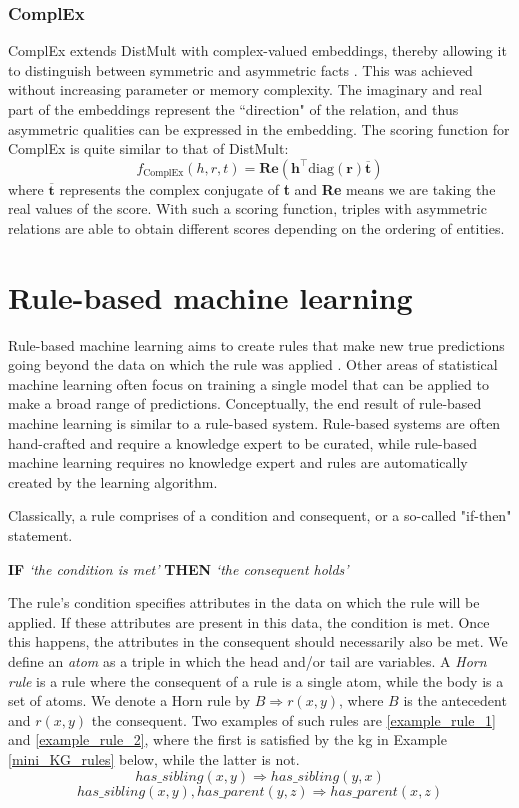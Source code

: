 \subsubsection{ComplEx}
ComplEx extends DistMult with complex-valued embeddings, thereby allowing it to distinguish between symmetric and asymmetric facts \cite{complEx}. This was achieved without increasing parameter or memory complexity. The imaginary and real part of the embeddings represent the ``direction" of the relation, and thus asymmetric qualities can be expressed in the embedding. The scoring function for ComplEx is quite similar to that of DistMult:
\[f_ {\text{ComplEx}}(h, r, t) =\textbf{Re}(\textbf{h}^{\top}\text{diag}(\textbf{r})\overline{\textbf{t}})\]
where $\overline{\textbf{t}}$ represents the complex conjugate of \textbf{t} and \textbf{Re} means we are taking the real values of the score. With such a scoring function, triples with asymmetric relations are able to obtain different scores depending on the ordering of entities.
    

\section{Rule-based machine learning}
Rule-based machine learning aims to create rules that make new true predictions going beyond the data on which the rule was applied \cite{weiss1995rule}. Other areas of statistical machine learning often focus on training a single model that can be applied to make a broad range of predictions. Conceptually, the end result of rule-based machine learning is similar to a rule-based system.  Rule-based systems are often hand-crafted and require a knowledge expert to be curated, while rule-based machine learning requires no knowledge expert and rules are automatically created by the learning algorithm.

Classically, a rule comprises of a condition and consequent, or a so-called "if-then" statement. \begin{center} \textbf{IF} \textit{`the condition is met'} \textbf{THEN} \textit{`the consequent holds'} \end{center}
The rule's condition specifies attributes in the data on which the rule will be applied. If these attributes are present in this data, the condition is met. Once this happens, the attributes in the consequent should necessarily also be met. We define an \textit{atom} as a triple in which the head and/or tail are variables. A \textit{Horn rule} is a rule where the consequent of a rule is a single atom, while the body is a set of atoms. We denote a Horn rule by $B \Rightarrow r(x, y)$, where $B$ is the antecedent and $r(x, y)$ the consequent. Two examples of such rules are \ref{example_rule_1} and \ref{example_rule_2}, where the first is satisfied by the \gls{kg} in Example \ref{mini_KG_rules} below, while the latter is not.
\begin{equation}
has\_sibling(x, y) \Rightarrow has\_sibling(y,x)
\label{example_rule_1}
\end{equation}
\begin{equation}
    has\_sibling(x, y), has\_parent(y,z) \Rightarrow has\_parent(x,z)
    \label{example_rule_2}
\end{equation}


